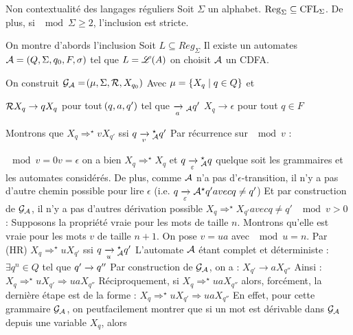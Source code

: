 \documentclass[a4paper,french,bookmarks]{book}
\DeclareMathOperator{\Reg}{Reg}
\begin{document}
    
    
    \begin{theorem}{Non contextualité des langages réguliers}{}
        Soit $\Sigma$ un alphabet.
        $\Reg_\Sigma \subseteq \CFL_\Sigma$.
        De plus, si $\mod{\Sigma} \geq 2$, l'inclusion est stricte. %
    \end{theorem}
    \begin{nproof}
        On montre d'abords l'inclusion
        Soit $L \subseteq Reg_\Sigma$
        Il existe un automates $\mathcal{A} = (Q,\Sigma, q_0, F, \sigma)$ tel que $L= \mathscr{L}(A)$
        on choisit $\mathcal{A}$ un CDFA.
        
        On construit $\mathcal{G}_{\mathcal{A}} = \!\left(\mu, \Sigma, \mathcal{R}, X_{q_0}\right)$
        Avec $\mu = \left\{X_q \;\middle\vert\; q \in Q\right\}$
        et 
        \begin{enumerate}
            \itt $\mathcal{R} X_q \to q X_q$ pour tout $\!\left(q, a, q'\right)$ tel que $\lima{a}{}_\bcA q'$
            \itt $X_q \to \epsilon$ pour tout $q \in F$
        \end{enumerate}
        Montrons que $X_q \Rightarrow^\star vX_{q'}$ ssi $q \lima{v}{}_\bcA^\star q'$
        Par récurrence sur $\mod{v}$ :
        \begin{enumerate}
            \itt $\mod{v} = 0 v = \epsilon$ on a bien $X_q \Rightarrow^\star X_q$ et $q \lima{\epsilon}{}_\bcA^\star q$ quelque soit les grammaires et les automates considérés.
            De plus, comme $\mathcal{A}$ n'a pas d'$\epsilon$-transition, il n'y a pas d'autre chemin possible pour lire $\epsilon$ (i.e. $q \lima{\epsilon}{}\bcA^\star q' avec q \neq q'$)
            Et par construction de $\mathcal{G}_{\mathcal{A}}$, il n'y a pas d'autres dérivation possible $X_q \Rightarrow^\star X_{q'} avec q \neq q'$
            \itt $\mod{v} > 0$ : Supposons la propriété vraie pour les mots de taille $n$. Montrons qu'elle est vraie pour les mots $v$ de taille $n + 1$.
            On pose $v = ua$ avec $\mod{u} = n$.
            Par (HR) $X_q \Rightarrow^\star u X_{q'}$ ssi $q \lima{u}{}_\bcA^\star q'$
            L'automate $\mathcal{A}$ étant complet et déterministe : $\exists q^n \in Q$ tel que $q' \lima q''$
            Par construction de $\mathcal{G}_{\mathcal{A}}$, on a : $X_{q'} \to aX_{q''}$
            Ainsi : $X_q \Rightarrow^\star u X_{q'} \Rightarrow uaX_{q''}$
            Réciproquement, si $X_q \Rightarrow^\star uaX_{q''}$ alors, forcément, la dernière étape est de la forme : $X_q \Rightarrow^\star uX_{q'} \Rightarrow uaX_{q''}$
            En effet, pour cette grammaire $\mathcal{G}_{\mathcal{A}}$, on peutfacilement montrer que si un mot est dérivable dans $\mathcal{G}_{\mathcal{A}}$ depuis une variable $X_q$, alors

\end{enumerate}
\end{nproof}
\end{document}
